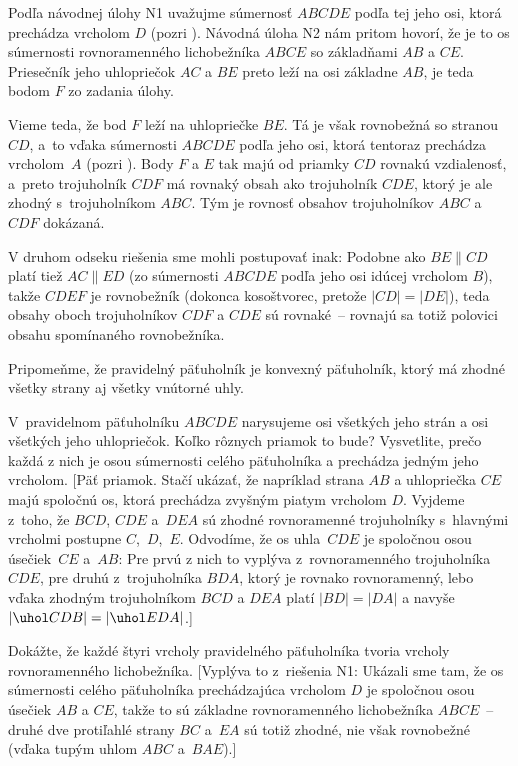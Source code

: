 {%
Podľa návodnej úlohy N1 uvažujme súmernosť $ABCDE$ podľa tej jeho osi,
ktorá prechádza vrcholom $D$ (pozri \obr{}).
Návodná úloha N2 nám pritom hovorí,
že je to os súmernosti rovnoramenného lichobežníka $ABCE$
so základňami $AB$ a $CE$. Priesečník jeho uhlopriečok $AC$ a $BE$
preto leží na osi základne $AB$, je teda bodom $F$ zo zadania úlohy.
%

Vieme teda, že bod $F$ leží na uhlopriečke $BE$. Tá je však
rovnobežná so stranou~$CD$, a~to vďaka súmernosti $ABCDE$
podľa jeho osi, ktorá tentoraz prechádza vrcholom~$A$ (pozri \obr{}). Body $F$ a $E$ tak majú od priamky
$CD$ rovnakú vzdialenosť, a~preto trojuholník $CDF$ má rovnaký obsah ako
trojuholník $CDE$, ktorý je ale zhodný s~trojuholníkom $ABC$. Tým je rovnosť
obsahov trojuholníkov $ABC$ a $CDF$ dokázaná.

\poznamka
V druhom odseku riešenia sme mohli postupovať inak: Podobne
ako $BE\parallel CD$ platí tiež $AC\parallel ED$ (zo
súmernosti $ABCDE$ podľa jeho osi idúcej vrcholom $B$), takže $CDEF$
je rovnobežník (dokonca kosoštvorec, pretože $|CD|=|DE|$), teda obsahy oboch trojuholníkov $CDF$ a $CDE$ sú rovnaké~-- rovnajú sa totiž polovici obsahu spomínaného rovnobežníka.


{\everypar{}
\smallskip
Pripomeňme, že pravidelný päťuholník je konvexný päťuholník,
ktorý má zhodné všetky strany aj všetky vnútorné uhly.
\smallskip
}

V~pravidelnom päťuholníku $ABCDE$ narysujeme osi všetkých jeho
strán a osi všetkých jeho uhlopriečok. Koľko rôznych priamok to bude?
Vysvetlite, prečo každá z nich je osou súmernosti celého
päťuholníka a prechádza jedným jeho vrcholom.
[Päť priamok. Stačí ukázať, že napríklad strana $AB$ a uhlopriečka $CE$
majú spoločnú os, ktorá prechádza zvyšným piatym vrcholom $D$.
Vyjdeme z~toho, že $BCD$, $CDE$ a~$DEA$ sú zhodné
rovnoramenné trojuholníky s~hlavnými vrcholmi postupne $C$,~$D$,~$E$.
Odvodíme, že os uhla~$CDE$ je spoločnou osou úsečiek~$CE$ a~$AB$:
Pre prvú z nich to vyplýva z~rovnoramenného trojuholníka $CDE$,
pre druhú z~trojuholníka $BDA$, ktorý je rovnako rovnoramenný, lebo
vďaka zhodným trojuholníkom $BCD$ a $DEA$ platí $|BD|=|DA|$ a navyše
$|\uhol CDB|=|\uhol EDA|$.]

Dokážte, že každé štyri vrcholy pravidelného
päťuholníka tvoria vrcholy rovnoramenného lichobežníka.
[Vyplýva to z~riešenia N1: Ukázali sme tam, že os súmernosti
celého päťuholníka prechádzajúca vrcholom $D$ je spoločnou osou
úsečiek $AB$ a $CE$, takže to sú základne rovnoramenného
lichobežníka $ABCE$~-- druhé dve protiľahlé strany $BC$ a~$EA$ sú totiž
zhodné, nie však rovnobežné (vďaka tupým uhlom $ABC$ a~$BAE$).]

}
